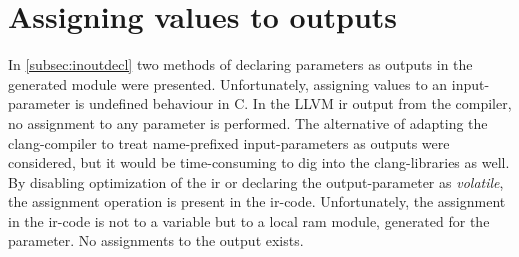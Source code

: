 \section{\label{sec:assValueToOutput}Assigning values to outputs}
In \cref{subsec:inoutdecl} two methods of declaring parameters as outputs in the generated module were presented. Unfortunately, assigning values to an input-parameter is undefined behaviour in C. In the LLVM \gls{ir} output from the compiler, no assignment to any parameter is performed. The alternative of adapting the clang-compiler to treat name-prefixed input-parameters as outputs were considered, but it would be time-consuming to dig into the clang-libraries as well. By disabling optimization of the \gls{ir} or declaring the output-parameter as \textit{volatile}, the assignment operation is present in the \gls{ir}-code. Unfortunately, the assignment in the \gls{ir}-code is not to a variable but to a local \gls{ram} module, generated for the parameter. No assignments to the output exists.


